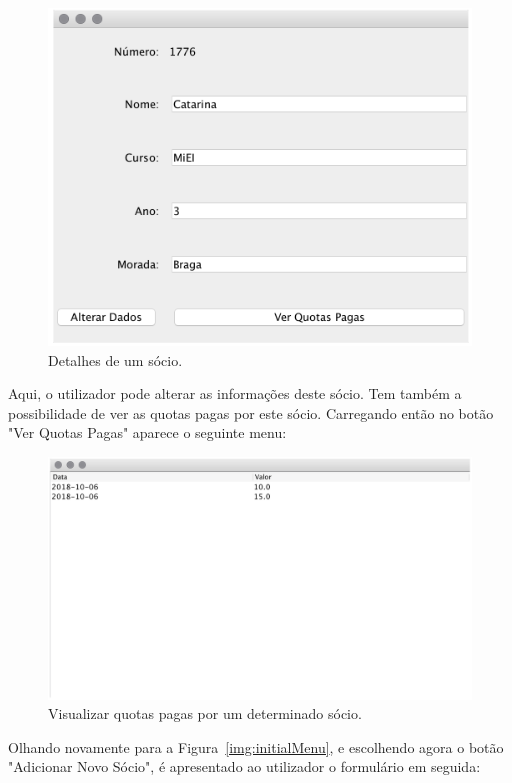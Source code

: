 \documentclass[a4paper]{article}
\begin{document}
\begin{figure}[H]
\centering
\includegraphics[scale=0.35]{imgs/detalheSocio.png}
\caption{Detalhes de um sócio.}
\label{img:detalheSocio}
\end{figure}

Aqui, o utilizador pode alterar as informações deste sócio. Tem também a possibilidade de ver as quotas pagas por este sócio. Carregando então no botão "Ver Quotas Pagas" aparece o seguinte menu:

\begin{figure}[H]
\centering
\includegraphics[scale=0.35]{imgs/verQuotas.png}
\caption{Visualizar quotas pagas por um determinado sócio.}
\label{img:verQuotas}
\end{figure}

Olhando novamente para a Figura~\ref{img:initialMenu}, e escolhendo agora o botão "Adicionar Novo Sócio", é apresentado ao utilizador o formulário em seguida:
\end{document}

